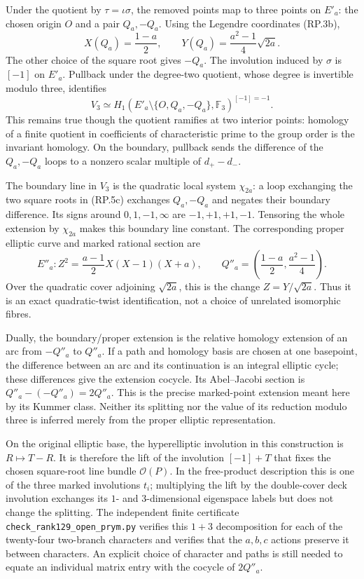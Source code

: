 Under the quotient by $\tau=\iota\sigma$, the
removed points map to three points on $E'_a$:
the chosen origin $O$ and a pair $Q_a,-Q_a$.
Using the Legendre coordinates (RP.3b),
\[
 X(Q_a)=\frac{1-a}{2},\qquad
 Y(Q_a)=\frac{a^2-1}{4}\sqrt{2a}.
 \tag{RP.5c}
\]
The other choice of the square root gives $-Q_a$.
The involution induced by $\sigma$ is $[-1]$ on
$E'_a$. Pullback under the degree-two quotient,
whose degree is invertible modulo three, identifies
\[
 V_3\simeq H_1(E'_a\setminus\{O,Q_a,-Q_a\},
                         \mathbb F_3)^{[-1]=-1}.
 \tag{RP.5d}
\]
This remains true though the quotient ramifies at
two interior points: homology of a finite quotient
in coefficients of characteristic prime to the
group order is the invariant homology. On the
boundary, pullback sends the difference of the
$Q_a,-Q_a$ loops to a nonzero scalar multiple of
$d_+-d_-$.

The boundary line in $V_3$ is the quadratic local
system $\chi_{2a}$: a loop exchanging the two
square roots in (RP.5c) exchanges $Q_a,-Q_a$ and
negates their boundary difference. Its signs
around $0,1,-1,\infty$ are $-1,+1,+1,-1$.
Tensoring the whole extension by $\chi_{2a}$
makes this boundary line constant. The corresponding
proper elliptic curve and marked rational section are
\[
 \boxed{\quad
 E''_a:Z^2=\frac{a-1}{2}X(X-1)(X+a),\qquad
 Q''_a=\left(\frac{1-a}{2},\frac{a^2-1}{4}\right).
 \quad}
 \tag{RP.5e}
\]
Over the quadratic cover adjoining $\sqrt{2a}$,
this is the change $Z=Y/\sqrt{2a}$. Thus it is an
exact quadratic-twist identification, not a choice
of unrelated isomorphic fibres.

Dually, the boundary/proper extension is the
relative homology extension of an arc from
$-Q''_a$ to $Q''_a$. If a path and homology basis
are chosen at one basepoint, the difference
between an arc and its continuation is an
integral elliptic cycle; these differences give
the extension cocycle. Its Abel--Jacobi section
is $Q''_a-(-Q''_a)=2Q''_a$. This is the precise
marked-point extension meant here by its Kummer
class. Neither its splitting nor the value of
its reduction modulo three is inferred merely
from the proper elliptic representation.

On the original elliptic base, the hyperelliptic
involution in this construction is $R\mapsto T-R$.
It is therefore the lift of the involution
$[-1]+T$ that fixes the chosen square-root line
bundle $\mathcal O(P)$. In the free-product
description this is one of the three marked
involutions $t_i$; multiplying the lift by the
double-cover deck involution exchanges its
$1$- and $3$-dimensional eigenspace labels but
does not change the splitting. The independent
finite certificate
\texttt{check\_rank129\_open\_prym.py} verifies
this $1+3$ decomposition for each of the twenty-four
two-branch characters and verifies that the
$a,b,c$ actions preserve it between characters.
An explicit choice of character and paths is
still needed to equate an individual matrix
entry with the cocycle of $2Q''_a$.

